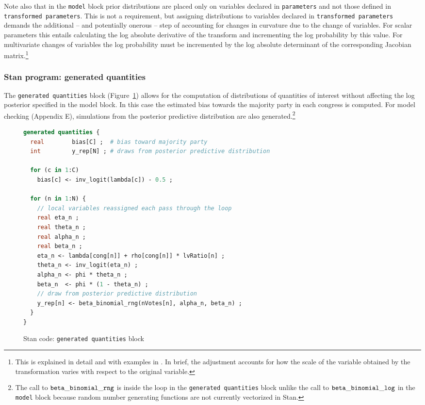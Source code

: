 Note also that in the {\tt model} block prior distributions are placed only on variables declared 
in {\tt parameters}  and not those defined in {\tt transformed parameters}. This is not a requirement, 
but assigning distributions to variables declared in {\tt transformed parameters} demands the 
additional -- and potentially onerous -- step of accounting for changes in curvature due to the 
change of variables. For scalar parameters this entails calculating the log absolute derivative of 
the transform and incrementing the log probability by this value. For multivariate changes of variables 
the log probability must be incremented by the log absolute determinant of the corresponding 
Jacobian matrix.\footnote{This is explained in detail and with examples in 
. In brief, the adjustment accounts for how 
the scale of the variable obtained by the transformation varies with respect to the 
original variable.}



\subsubsection{Stan program: generated quantities}

The {\tt generated quantities} block (Figure~\ref{stan_generated_quantities}) allows for the computation 
of distributions of quantities of interest without affecting the log posterior specified in the model block. 
In this case the estimated bias towards the majority party in each congress is computed. For model 
checking (Appendix E), %
simulations from the posterior predictive distribution 
are also generated.\footnote{The call to ${\tt beta\_binomial\_rng}$ is inside the loop in the 
{\tt generated quantities} block unlike the call to ${\tt beta\_binomial\_log}$ in the {\tt model} block because 
random number generating functions are not currently vectorized in Stan.} 


\begin{figure}[h]
\begin{lstlisting}[language=Stan, frame=trBL]
generated quantities {
  real        bias[C] ;  # bias toward majority party
  int         y_rep[N] ; # draws from posterior predictive distribution
  
  for (c in 1:C) 
    bias[c] <- inv_logit(lambda[c]) - 0.5 ;
  
  for (n in 1:N) {
    // local variables reassigned each pass through the loop
    real eta_n ;
    real theta_n ;
    real alpha_n ;
    real beta_n ;
    eta_n <- lambda[cong[n]] + rho[cong[n]] * lvRatio[n] ;
    theta_n <- inv_logit(eta_n) ;    
    alpha_n <- phi * theta_n ;
    beta_n  <- phi * (1 - theta_n) ;
    // draw from posterior predictive distribution
    y_rep[n] <- beta_binomial_rng(nVotes[n], alpha_n, beta_n) ;
  }
}
\end{lstlisting}
\caption{Stan code: {\tt generated quantities} block}
\label{stan_generated_quantities}
\end{figure}

\clearpage

